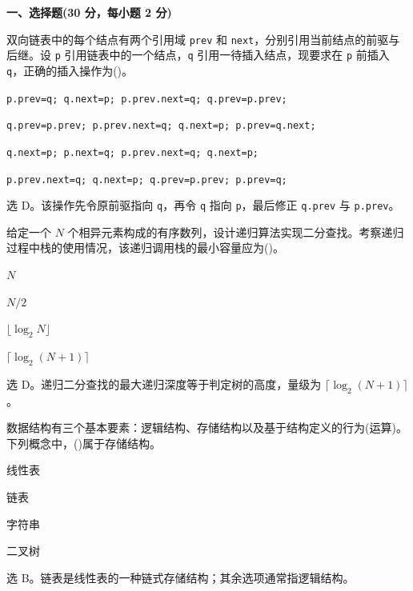 \textbf{一、选择题(30 分，每小题 2 分)}

\begin{question}
双向链表中的每个结点有两个引用域 \texttt{prev} 和 \texttt{next}，分别引用当前结点的前驱与后继。设 \texttt{p} 引用链表中的一个结点，\texttt{q} 引用一待插入结点，现要求在 \texttt{p} 前插入 \texttt{q}，正确的插入操作为(\quad)。
\begin{choiceoptions}[1]
  \item \texttt{p.prev=q; q.next=p; p.prev.next=q; q.prev=p.prev;}
  \item \texttt{q.prev=p.prev; p.prev.next=q; q.next=p; p.prev=q.next;}
  \item \texttt{q.next=p; p.next=q; p.prev.next=q; q.next=p;}
  \item \texttt{p.prev.next=q; q.next=p; q.prev=p.prev; p.prev=q;}
\end{choiceoptions}
\begin{solution}
选 D。该操作先令原前驱指向 \texttt{q}，再令 \texttt{q} 指向 \texttt{p}，最后修正 \texttt{q.prev} 与 \texttt{p.prev}。
\end{solution}
\end{question}

\begin{question}
给定一个 $N$ 个相异元素构成的有序数列，设计递归算法实现二分查找。考察递归过程中栈的使用情况，该递归调用栈的最小容量应为(\quad)。
\begin{choiceoptions}[2]
  \item $N$
  \item $N/2$
  \item $\lfloor \log_2 N\rfloor$
  \item $\lceil \log_2 (N+1)\rceil$
\end{choiceoptions}
\begin{solution}
选 D。递归二分查找的最大递归深度等于判定树的高度，量级为 $\lceil\log_2(N+1)\rceil$。
\end{solution}
\end{question}

\begin{question}
数据结构有三个基本要素：逻辑结构、存储结构以及基于结构定义的行为(运算)。下列概念中，(\quad)属于存储结构。
\begin{choiceoptions}[2]
  \item 线性表
  \item 链表
  \item 字符串
  \item 二叉树
\end{choiceoptions}
\begin{solution}
选 B。链表是线性表的一种链式存储结构；其余选项通常指逻辑结构。
\end{solution}
\end{question}

